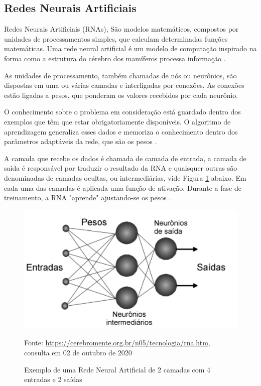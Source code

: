 \documentclass[12pt]{article}
\begin{document}
\subsection{Redes Neurais Artificiais}

Redes Neurais Artificiais (RNAs), São modelos matemáticos, compostos por 
unidades de processamentos simples, que calculam determinadas funções 
matemáticas. Uma rede neural artificial é um modelo de computação inspirado na 
forma como a estrutura do cérebro dos mamíferos processa informação 
\cite{de2003tecnicas}.

As unidades de processamento, também chamadas de nós ou neurônios, são
dispostas em uma ou várias camadas e interligadas por conexões. 
As conexões estão ligadas a pesos, que ponderam os valores recebidos por cada 
neurônio.

O conhecimento sobre o problema em consideração está guardado dentro dos
exemplos que têm que estar obrigatoriamente disponíveis. O algoritmo de
aprendizagem generaliza esses dados e memoriza o conhecimento dentro dos
parâmetros adaptáveis da rede, que são os pesos \cite{rauber2005redes}.

A camada que recebe os dados é chamada de camada de entrada, a camada de saída
é responsável por traduzir o resultado da RNA e quaisquer outras são denominadas 
de camadas ocultas, ou intermediárias, vide Figura \ref{fig:nnet} abaixo. 
Em cada uma das camadas é aplicada uma função de ativação. Durante a fase de 
treinamento, a RNA "aprende" ajustando-se os pesos \cite{bishop1996neural}.

\begin{figure}[ht]
  \centering
  \includegraphics[scale=0.6]{img/nnet.png}
  \caption{Exemplo de uma Rede Neural Artificial de 2 camadas com 4 
  entradas e 2 saídas}
  Fonte: \url{https://cerebromente.org.br/n05/tecnologia/rna.htm}, 
  \\consulta em 02 de outubro de 2020
  \label{fig:nnet}
\end{figure}
\end{document}
